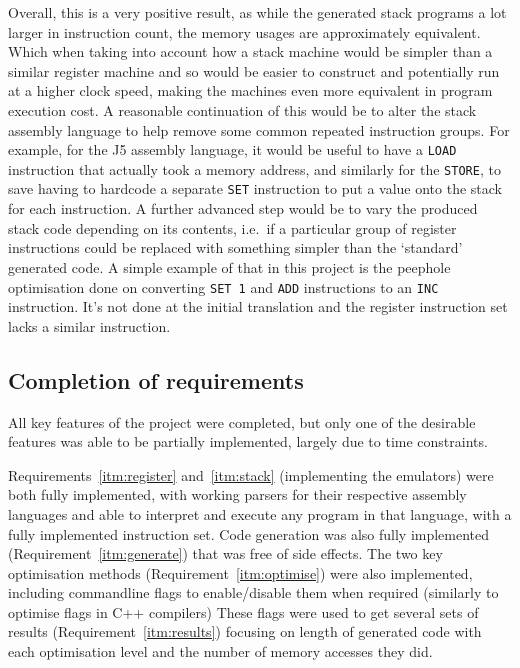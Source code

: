 Overall, this is a very positive result, as while the generated stack programs a
lot larger in instruction count, the memory usages are approximately equivalent.
Which when taking into account how a stack machine would be simpler than a
similar register machine and so would be easier to construct and potentially run
at a higher clock speed, making the machines even more equivalent in program
execution cost. A reasonable continuation of this would be to alter the stack
assembly language to help remove some common repeated instruction groups. For
example, for the J5 assembly language, it would be useful to have a
\texttt{LOAD} instruction that actually took a memory address, and similarly for
the \texttt{STORE}, to save having to hardcode a separate \texttt{SET}
instruction to put a value onto the stack for each instruction. A further
advanced step would be to vary the produced stack code depending on its
contents, i.e.\ if a particular group of register instructions could be replaced
with something simpler than the `standard' generated code. A simple example of
that in this project is the peephole optimisation done on converting \texttt{SET
1} and \texttt{ADD} instructions to an \texttt{INC} instruction. It's not done
at the initial translation and the register instruction set lacks a similar
instruction.

\subsection{Completion of requirements}
All key features of the project were completed, but only one of the desirable
features was able to be partially implemented, largely due to time constraints.

Requirements~\ref{itm:register} and~\ref{itm:stack} (implementing the emulators)
were both fully implemented, with working parsers for their respective assembly
languages and able to interpret and execute any program in that language, with a
fully implemented instruction set.  Code generation was also fully implemented
(Requirement~\ref{itm:generate}) that was free of side effects.  The two key
optimisation methods (Requirement~\ref{itm:optimise}) were also implemented,
including commandline flags to enable/disable them when required (similarly to
optimise flags in C++ compilers) These flags were used to get several sets of
results (Requirement~\ref{itm:results}) focusing on length of generated code
with each optimisation level and the number of memory accesses they did.

